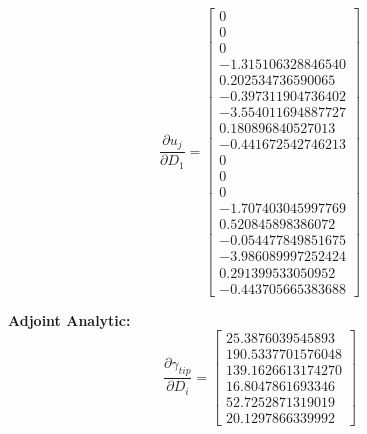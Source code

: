 \documentclass[12pt,parskip=full]{article}
\numberwithin{subsection}{section}
\begin{document}
		\begin{equation}
			\frac{\partial u_j}{\partial D_1} = \begin{bmatrix} 0 \\
                   0 \\
                   0 \\
  -1.315106328846540 \\
   0.202534736590065 \\
  -0.397311904736402 \\
  -3.554011694887727 \\
   0.180896840527013 \\
  -0.441672542746213 \\
                   0 \\
                   0 \\
                   0 \\
  -1.707403045997769 \\
   0.520845898386072 \\
  -0.054477849851675 \\
  -3.986089997252424 \\
   0.291399533050952 \\
  -0.443705665383688
   			\end{bmatrix}
		\end{equation}
		
		
		\pagebreak
		\textbf{Adjoint Analytic:}
		\begin{equation}
			\frac{\partial \gamma_{tip}}{\partial D_i} = \begin{bmatrix} 25.3876039545893 \\
   190.5337701576048 \\
   139.1626613174270 \\
   16.8047861693346 \\
   52.7252871319019 \\
   20.1297866339992
   			\end{bmatrix}
		\end{equation}
\end{document}
